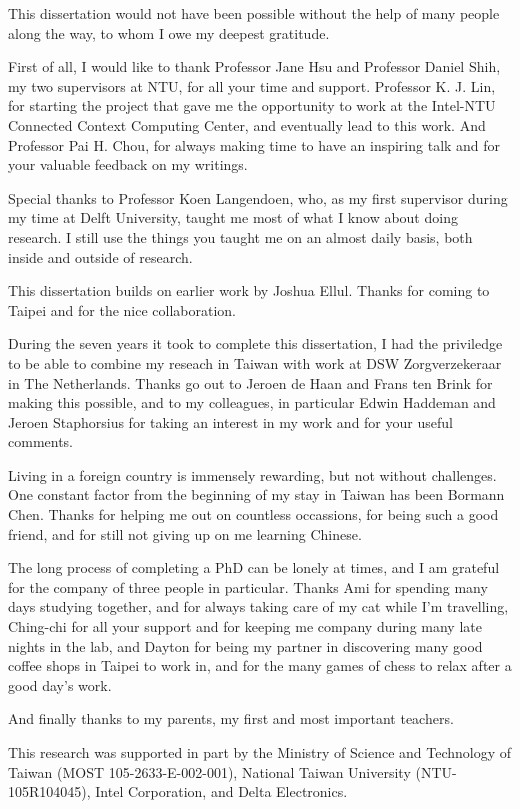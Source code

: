 \begin{acknowledgementsen}

This dissertation would not have been possible without the help of many people along the way, to whom I owe my deepest gratitude.

First of all, I would like to thank Professor Jane Hsu and Professor Daniel Shih, my two supervisors at NTU, for all your time and support. Professor K. J. Lin, for starting the project that gave me the opportunity to work at the Intel-NTU Connected Context Computing Center, and eventually lead to this work. And Professor Pai H. Chou, for always making time to have an inspiring talk and for your valuable feedback on my writings.

Special thanks to Professor Koen Langendoen, who, as my first supervisor during my time at Delft University, taught me most of what I know about doing research. I still use the things you taught me on an almost daily basis, both inside and outside of research. 

This dissertation builds on earlier work by Joshua Ellul. Thanks for coming to Taipei and for the nice collaboration.

During the seven years it took to complete this dissertation, I had the priviledge to be able to combine my reseach in Taiwan with work at DSW Zorgverzekeraar in The Netherlands. Thanks go out to Jeroen de Haan and Frans ten Brink for making this possible, and to my colleagues, in particular Edwin Haddeman and Jeroen Staphorsius for taking an interest in my work and for your useful comments.

Living in a foreign country is immensely rewarding, but not without challenges. One constant factor from the beginning of my stay in Taiwan has been Bormann Chen. Thanks for helping me out on countless occassions, for being such a good friend, and for still not giving up on me learning Chinese.

The long process of completing a PhD can be lonely at times, and I am grateful for the company of three people in particular. Thanks Ami for spending many days studying together, and for always taking care of my cat while I'm travelling, Ching-chi for all your support and for keeping me company during many late nights in the lab, and Dayton for being my partner in discovering many good coffee shops in Taipei to work in, and for the many games of chess to relax after a good day's work.

And finally thanks to my parents, my first and most important teachers. 
  
\vspace{2cm} 

This research was supported in part by the Ministry of Science and Technology of Taiwan (MOST 105-2633-E-002-001), National Taiwan University (NTU-105R104045), Intel Corporation, and Delta Electronics.
\end{acknowledgementsen}
